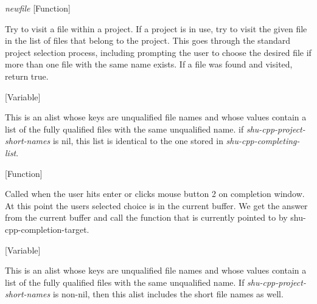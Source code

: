 \vspace{1em}
\noindent
{}
\usebox{\funcname}\emph{newfile}
 \hfill [Function]

\begin{doc-string}
Try to visit a file within a project.  If a project is in use, try to visit
the given file in the list of files that belong to the project.  This goes
through the standard project selection process, including prompting the user to
choose the desired file if more than one file with the same name exists.  If a
file was found and visited, return true.
\end{doc-string}

\vspace{1em}
\noindent
{}
\usebox{\funcname}
 \hfill [Variable]

\begin{doc-string}
This is an alist whose keys are unqualified file names and whose values
contain a list of the fully qualified files with the same unqualified name.  if
\emph{shu-cpp-project-short-names} is nil, this list is identical to the one stored in
\emph{shu-cpp-completing-list}.
\end{doc-string}

\vspace{1em}
\noindent
{}
\usebox{\funcname}
 \hfill [Function]

\begin{doc-string}
Called when the user hits enter or clicks mouse button 2 on completion window.
At this point the users selected choice is in the current buffer.  We get the
answer from the current buffer and call the function that is currently
pointed to by shu-cpp-completion-target.
\end{doc-string}

\vspace{1em}
\noindent
{}
\usebox{\funcname}
 \hfill [Variable]

\begin{doc-string}
This is an alist whose keys are unqualified file names and whose values
contain a list of the fully qualified files with the same unqualified name.  If
\emph{shu-cpp-project-short-names} is non-nil, then this alist includes the short file
names as well.
\end{doc-string}

